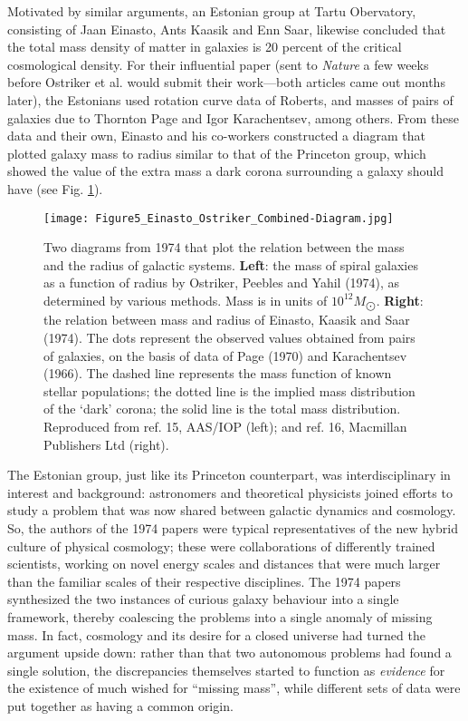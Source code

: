 \documentclass{naturefig}
\begin{document}
Motivated by similar arguments, an Estonian group at Tartu Obervatory, consisting of Jaan Einasto, Ants Kaasik and Enn Saar, likewise concluded that the total mass density of matter in galaxies is 20 percent of the critical cosmological density.\cite{Einasto1974} For their influential paper (sent to \emph{Nature} a few weeks before Ostriker et al. would submit their work---both articles came out months later), the Estonians used rotation curve data of Roberts,\cite{Roberts1975} and masses of pairs of galaxies due to Thornton Page\cite{Page1970} and Igor Karachentsev\cite{Karachentsev1966}, among others. From these data and their own, Einasto and his co-workers constructed a diagram that plotted galaxy mass to radius similar to that of the Princeton group, which showed the value of the extra mass a dark corona surrounding a galaxy should have (see Fig. \ref{fig:EinastoOstriker}).

\begin{figure}[t]
	\centering
	\texttt{[image: Figure5\_Einasto\_Ostriker\_Combined-Diagram.jpg]}
    \caption{ \label{fig:EinastoOstriker}
Two diagrams from 1974 that plot the relation between the mass and the radius of galactic systems. \textbf{Left}: the mass of spiral galaxies as a function of radius by Ostriker, Peebles and Yahil (1974), as determined by various methods. Mass is in units of $10^{12} M_{\bigodot}$. \textbf{Right}: the relation between mass and radius of Einasto, Kaasik and Saar (1974). The dots represent the observed values obtained from pairs of galaxies, on the basis of data of Page (1970) and Karachentsev (1966). The dashed line represents the mass function of known stellar populations; the dotted line is the implied mass distribution of the `dark' corona; the solid line is the total mass distribution. Reproduced from ref. 15, AAS/IOP (left); and ref. 16, Macmillan Publishers Ltd (right).}
\end{figure}

The Estonian group, just like its Princeton counterpart, was interdisciplinary in interest and background: astronomers and theoretical physicists joined efforts to study a problem that was now shared between galactic dynamics and cosmology. So, the authors of the 1974 papers were typical representatives of the new hybrid culture of physical cosmology; these were collaborations of differently trained scientists, working on novel energy scales and distances that were much larger than the familiar scales of their respective disciplines. The 1974 papers synthesized the two instances of curious galaxy behaviour into a single framework, thereby coalescing the problems into a single anomaly of missing mass. In fact, cosmology and its desire for a closed universe had turned the argument upside down: rather than that two autonomous problems had found a single solution, the discrepancies themselves started to function as \emph{evidence} for the existence of much wished for ``missing mass'', while different sets of data were put together as having a common origin.\cite{Janssen2002}
\end{document}
